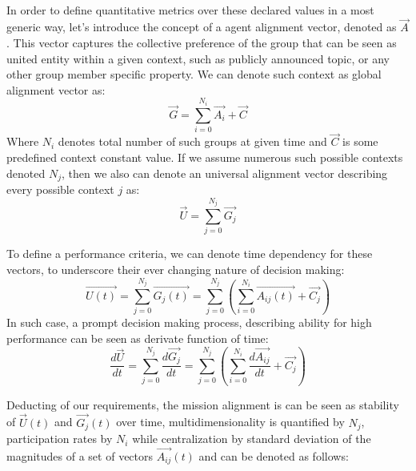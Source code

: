 \documentclass{article}
\begin{document}
\begin{CJK}{UTF8}{gbsn}
\begin{multicols}{2}
        \paragraph*{}
        In order to define quantitative metrics over these declared values in a most generic way, let's introduce the concept of a agent alignment vector, denoted as  $\vec{A}$. This vector captures the collective preference of the group that can be seen as united entity within a given context, such as publicly announced topic, or any other group member specific property. We can denote such context as global alignment vector as:
        \begin{equation}
            \label{eq:glob-align}
            \vec{G} = \sum_{i=0}^{N_{i}} \vec{A_i} + \vec{C}
        \end{equation} Where $N_i$ denotes total number of such groups at given time and $\vec{C}$ is some predefined context constant value.
        If we assume numerous such possible contexts denoted ${N_j}$, then we also can denote an universal alignment vector describing every possible context $j$ as:
        \begin{equation}
            \vec{U} = \sum_{j=0}^{N_{j}} \vec{G_j}
        \end{equation}

        To define a performance criteria, we can denote time dependency for these vectors, to underscore their ever changing nature of decision making:
        \begin{equation}
            \vec{U(t)} = \sum_{j=0}^{N_{j}} \vec{G_j(t)} = \sum_{j=0}^{N_{j}}(\sum_{i=0}^{N_{i}} \vec{A_{ij}(t)} + \vec{C_j})
        \end{equation}
        In such case, a prompt decision making process,  describing ability for high performance can be seen as derivate function of time:
        \begin{equation}
            \label{eq:speed-of-changes}
            \frac{d\vec{U}}{dt} = \sum_{j=0}^{N_{j}} \frac{d\vec{G_j}}{dt} = \sum_{j=0}^{N_{j}} (\sum_{i=0}^{N_{i}} \frac{d\vec{A_{ij}}}{dt} + \vec{C_j})
        \end{equation}

        Deducting of our requirements, the mission alignment is can be seen as stability of $\vec{U}(t)$ and $\vec{G_j}(t)$ over time, multidimensionality is quantified by ${N_j}$,  participation rates by $N_i$ while centralization by standard deviation of the magnitudes of a set of vectors $\vec{A_{ij}}(t)$ and can be denoted as follows:


\end{multicols}
\end{CJK}
\end{document}
